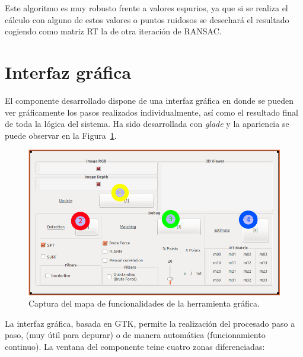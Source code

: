 Este algoritmo es muy robusto frente a valores espurios, ya que si se realiza el cálculo con alguno de estos valores o puntos ruidosos se desechará el resultado cogiendo como matriz RT la de otra iteración de RANSAC.

\section{Interfaz gráfica}

El componente desarrollado dispone de una interfaz gráfica en donde se pueden ver gráficamente los pasos realizados individualmente, así como el resultado final de toda la lógica del sistema. Ha sido desarrollada con \textit{glade} y la apariencia se puede observar en la Figura~\ref{fig:supergui}.

\begin{figure}[th]
\centering
\includegraphics[scale=0.48]{Figures/super_gui.png}
\decoRule
\caption[Captura del mapa de funcionalidades de la herramienta gráfica]{Captura del mapa de funcionalidades de la herramienta gráfica.}
\label{fig:supergui}
\end{figure}

La interfaz gráfica, basada en GTK, permite la realización  del procesado paso a paso, (muy útil para depurar) o de manera automática (funcionamiento continuo). La ventana del componente teine cuatro zonas diferenciadas: 

